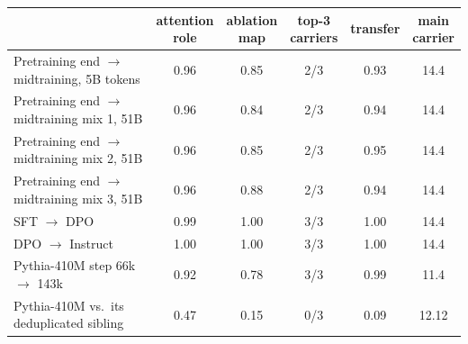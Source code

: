 \begin{tabular}{lccccc}
\toprule
& \makecell{attention\\role} & \makecell{ablation\\map} & \makecell{top-3\\carriers} & transfer & \makecell{main\\carrier} \\
\midrule
Pretraining end $\to$ midtraining, 5B tokens & 0.96 & 0.85 & 2/3 & 0.93 & 14.4 \\
Pretraining end $\to$ midtraining mix 1, 51B & 0.96 & 0.84 & 2/3 & 0.94 & 14.4 \\
Pretraining end $\to$ midtraining mix 2, 51B & 0.96 & 0.85 & 2/3 & 0.95 & 14.4 \\
Pretraining end $\to$ midtraining mix 3, 51B & 0.96 & 0.88 & 2/3 & 0.94 & 14.4 \\
SFT $\to$ DPO & 0.99 & 1.00 & 3/3 & 1.00 & 14.4 \\
DPO $\to$ Instruct & 1.00 & 1.00 & 3/3 & 1.00 & 14.4 \\
Pythia-410M step 66k $\to$ 143k & 0.92 & 0.78 & 3/3 & 0.99 & 11.4 \\
\midrule
Pythia-410M vs.\ its deduplicated sibling & 0.47 & 0.15 & 0/3 & 0.09 & 12.12 \\
\bottomrule
\end{tabular}
